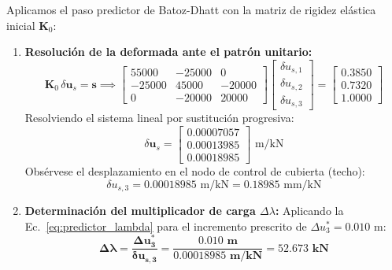 \documentclass[11pt,letterpaper]{article}
\begin{document}
\begin{examplebox}
Aplicamos el paso predictor de Batoz-Dhatt con la matriz de rigidez elástica inicial $\mathbf{K}_0$:
\begin{enumerate}
    \item \textbf{Resolución de la deformada ante el patrón unitario:}
    \begin{equation}
        \mathbf{K}_0 \, \delta \mathbf{u}_s = \mathbf{s} \implies
        \begin{bmatrix}
            55000 & -25000 & 0 \\
            -25000 & 45000 & -20000 \\
            0 & -20000 & 20000
        \end{bmatrix}
        \begin{bmatrix}
            \delta u_{s,1} \\ \delta u_{s,2} \\ \delta u_{s,3}
        \end{bmatrix} =
        \begin{bmatrix}
            0.3850 \\ 0.7320 \\ 1.0000
        \end{bmatrix}
    \end{equation}
    Resolviendo el sistema lineal por sustitución progresiva:
    \begin{equation}
        \delta \mathbf{u}_s = \begin{bmatrix} 0.00007057 \\ 0.00013985 \\ 0.00018985 \end{bmatrix} \text{ m/kN}
    \end{equation}
    Obsérvese el desplazamiento en el nodo de control de cubierta (techo):
    \begin{equation}
        \delta u_{s,3} = 0.00018985\text{ m/kN} = 0.18985\text{ mm/kN}
    \end{equation}
    
    \item \textbf{Determinación del multiplicador de carga $\Delta \lambda$:}
    Aplicando la Ec.~\eqref{eq:predictor_lambda} para el incremento prescrito de $\Delta u_3^* = 0.010\text{ m}$:
    \begin{equation}
        \mathbf{\Delta \lambda = \frac{\Delta u_3^*}{\delta u_{s,3}} = \frac{0.010\text{ m}}{0.00018985\text{ m/kN}} = 52.673\text{ kN}}
    \end{equation}
    

\end{enumerate}
\end{examplebox}
\end{document}
